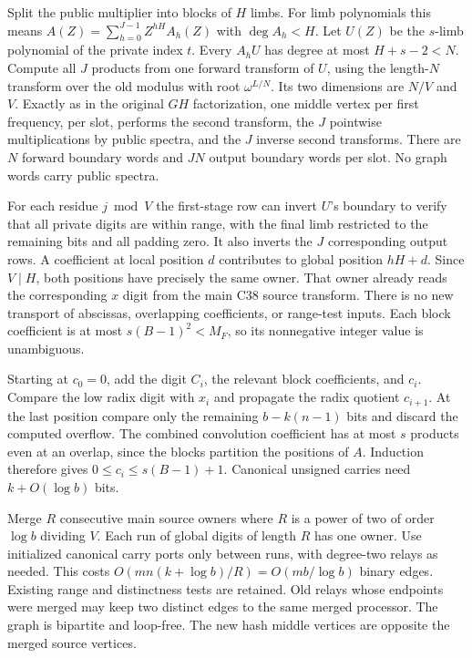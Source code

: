 \documentclass[11pt]{article}
\begin{document}
Split the public multiplier into blocks of $H$ limbs. For limb
polynomials this means $A(Z)=\sum_{h=0}^{J-1}Z^{hH}A_h(Z)$ with
$\deg A_h<H$. Let $U(Z)$ be the $s$-limb polynomial of the private
index $t$. Every $A_h U$ has degree at most $H+s-2<N$.
Compute all $J$ products from one forward transform of $U$, using the
length-$N$ transform over the old modulus with root $\omega^{L/N}$.
Its two dimensions are $N/V$ and $V$. Exactly as in the original
$GH$ factorization, one middle vertex per first frequency, per slot,
performs the second transform, the $J$ pointwise multiplications by
public spectra, and the $J$ inverse second transforms. There are
$N$ forward boundary words and $JN$ output boundary words per slot.
No graph words carry public spectra.

For each residue $j\bmod V$ the first-stage row can invert $U$'s
boundary to verify that all private digits are within range, with
the final limb restricted to the remaining bits and all padding zero.
It also inverts the $J$ corresponding output rows. A coefficient at
local position $d$ contributes to global position $hH+d$.
Since $V\mid H$, both positions have precisely the same owner. That
owner already reads the corresponding $x$ digit from the main C38
source transform. There is no new transport of abscissas, overlapping
coefficients, or range-test inputs. Each block coefficient is at most
$s(B-1)^2<M_F$, so its nonnegative integer value is unambiguous.

Starting at $c_0=0$, add the digit $C_i$, the relevant block
coefficients, and $c_i$. Compare the low radix digit with $x_i$ and
propagate the radix quotient $c_{i+1}$. At the last position compare
only the remaining $b-k(n-1)$ bits and discard the computed overflow.
The combined convolution coefficient has at most $s$ products even at
an overlap, since the blocks partition the positions of $A$. Induction
therefore gives $0\le c_i\le s(B-1)+1$. Canonical unsigned carries
need $k+O(\log b)$ bits.

Merge $R$ consecutive main source owners where $R$ is a power of two
of order $\log b$ dividing $V$. Each run of global digits of length
$R$ has one owner. Use initialized canonical carry ports only between
runs, with degree-two relays as needed. This costs
$O(mn(k+\log b)/R)=O(mb/\log b)$ binary edges. Existing range and
distinctness tests are retained. Old relays whose endpoints were
merged may keep two distinct edges to the same merged processor.
The graph is bipartite and loop-free. The new hash middle vertices
are opposite the merged source vertices.
\end{document}
